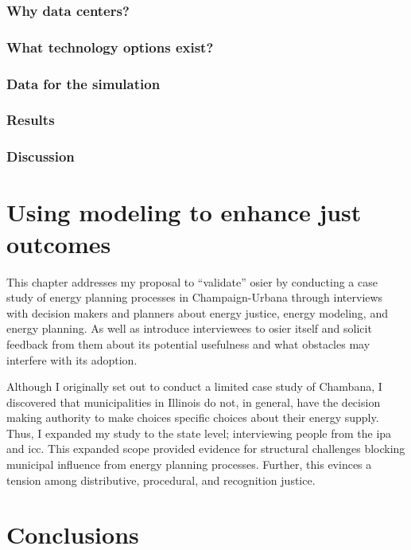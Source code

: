 \subsection{Why data centers?}

\subsection{What technology options exist?}

\subsection{Data for the simulation}

\subsection{Results}

\subsection{Discussion}

\chapter{Using modeling to enhance just outcomes}

This chapter addresses my proposal to ``validate'' \ac{osier} by conducting a
case study of energy planning processes in Champaign-Urbana through interviews
with decision makers and planners about energy justice, energy modeling, and
energy planning. As well as introduce interviewees to \ac{osier} itself and
solicit feedback from them about its potential usefulness and what obstacles may
interfere with its adoption. 

Although I originally set out to conduct a limited case study of Chambana, I
discovered that municipalities in Illinois do not, in general, have the decision
making authority to make choices specific choices about their energy supply.
Thus, I expanded my study to the state level; interviewing people from the
\ac{ipa} and \ac{icc}. This expanded scope provided evidence for structural
challenges blocking municipal influence from energy planning processes. Further,
this evinces a tension among distributive, procedural, and recognition justice.

\chapter{Conclusions}

